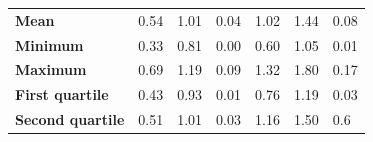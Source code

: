 \documentclass[10pt,a4paper]{article}
\begin{document}
\begin{itemize}
\begin{enumerate}
\begin{table}[h!]
\begin{tabular}{l|llllll}
					\textbf{Mean}                           & 0.54                                                                 & 1.01                                                             & \multicolumn{1}{l|}{0.04}                                                                  & 1.02                                                                 & 1.44                                                             & 0.08                                                                  \\
					\textbf{Minimum}                        & 0.33                                                                 & 0.81                                                             & \multicolumn{1}{l|}{0.00}                                                                  & 0.60                                                                 & 1.05                                                             & 0.01                                                                  \\
					\textbf{Maximum}                        & 0.69                                                                 & 1.19                                                             & \multicolumn{1}{l|}{0.09}                                                                  & 1.32                                                                 & 1.80                                                             & 0.17                                                                  \\ \hline
					\textbf{First quartile}                 & 0.43                                                                 & 0.93                                                             & \multicolumn{1}{l|}{0.01}                                                                  & 0.76                                                                 & 1.19                                                             & 0.03                                                                  \\
					\textbf{Second quartile}                & 0.51                                                                 & 1.01                                                             & \multicolumn{1}{l|}{0.03}                                                                  & 1.16                                                                 & 1.50                                                             & 0.6                                                                  \\

\end{tabular}
\end{table}
\end{enumerate}
\end{itemize}
\end{document}
